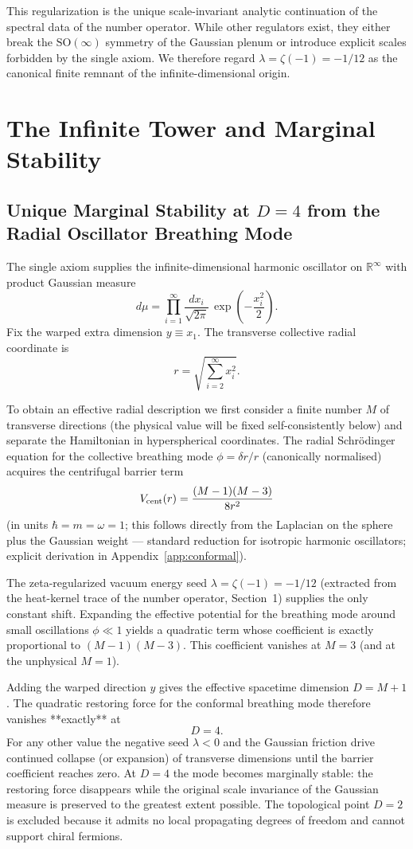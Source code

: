 \documentclass[11pt,a4paper,oneside]{article}
\begin{document}
This regularization is the unique scale-invariant analytic continuation of the spectral data of the number operator. While other regulators exist, they either break the \(\mathrm{SO}(\infty)\) symmetry of the Gaussian plenum or introduce explicit scales forbidden by the single axiom. We therefore regard \(\lambda = \zeta(-1) = -1/12\) as the canonical finite remnant of the infinite-dimensional origin.
\section{The Infinite Tower and Marginal Stability}

\subsection{Unique Marginal Stability at \(D=4\) from the Radial Oscillator Breathing Mode}

The single axiom supplies the infinite-dimensional harmonic oscillator on \(\mathbb{R}^\infty\) with product Gaussian measure
\[
d\mu = \prod_{i=1}^\infty \frac{dx_i}{\sqrt{2\pi}}\, \exp\left(-\frac{x_i^2}{2}\right).
\]
Fix the warped extra dimension \(y \equiv x_1\). The transverse collective radial coordinate is
\[
r = \sqrt{\sum_{i=2}^\infty x_i^2}.
\]

To obtain an effective radial description we first consider a finite number \(M\) of transverse directions (the physical value will be fixed self-consistently below) and separate the Hamiltonian in hyperspherical coordinates. The radial Schrödinger equation for the collective breathing mode \(\phi = \delta r / r\) (canonically normalised) acquires the centrifugal barrier term
\[
V_{\rm cent}(r) = \frac{(M-1)(M-3)}{8 r^2}
\]
(in units \(\hbar = m = \omega = 1\); this follows directly from the Laplacian on the sphere plus the Gaussian weight — standard reduction for isotropic harmonic oscillators; explicit derivation in Appendix~\ref{app:conformal}).

The zeta-regularized vacuum energy seed \(\lambda = \zeta(-1) = -1/12\) (extracted from the heat-kernel trace of the number operator, Section~1) supplies the only constant shift. Expanding the effective potential for the breathing mode around small oscillations \(\phi \ll 1\) yields a quadratic term whose coefficient is exactly proportional to \((M-1)(M-3)\). This coefficient vanishes at \(M=3\) (and at the unphysical \(M=1\)).

Adding the warped direction \(y\) gives the effective spacetime dimension \(D = M + 1\). The quadratic restoring force for the conformal breathing mode therefore vanishes **exactly** at
\[
D=4.
\]
For any other value the negative seed \(\lambda < 0\) and the Gaussian friction drive continued collapse (or expansion) of transverse dimensions until the barrier coefficient reaches zero. At \(D=4\) the mode becomes marginally stable: the restoring force disappears while the original scale invariance of the Gaussian measure is preserved to the greatest extent possible. The topological point \(D=2\) is excluded because it admits no local propagating degrees of freedom and cannot support chiral fermions.
\end{document}
